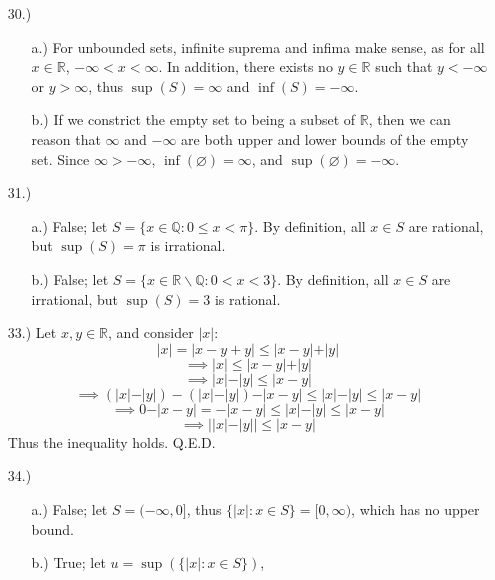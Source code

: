 \documentclass[12pt]{article}
\begin{document}
\begin{itemize}
    \item [30.)] \begin{itemize}
        \item [a.)] For unbounded sets, infinite suprema and infima make sense, as for all $x\in\mathbb{R}$, $-\infty<x<\infty$. In addition, there exists no $y\in\mathbb{R}$ such that $y<-\infty$ or $y>\infty$, thus $\sup(S)=\infty$ and $\inf(S)=-\infty$.

        \item [b.)] If we constrict the empty set to being a subset of $\mathbb{R}$, then we can reason that $\infty$ and $-\infty$ are both upper and lower bounds of the empty set. Since $\infty>-\infty$, $\inf(\varnothing)=\infty$, and $\sup(\varnothing)=-\infty$.
    \end{itemize}

    \item [31.)] \begin{itemize}
        \item [a.)] False; let $S=\{x\in\mathbb{Q}:0\leq x<\pi\}$. By definition, all $x\in S$ are rational, but $\sup(S)=\pi$ is irrational.

        \item [b.)] False; let $S=\{x\in\mathbb{R}\backslash\mathbb{Q}:0<x<3\}$. By definition, all $x\in S$ are irrational, but $\sup(S)=3$ is rational.
    \end{itemize}

    \item [33.)] Let $x,y\in\mathbb{R}$, and consider $\vert x\vert$:
        \[\vert x\vert=\vert x-y+y\vert\leq\vert x-y\vert+\vert y\vert\]
        \[\implies\vert x\vert\leq\vert x-y\vert+\vert y\vert\]
        \[\implies\vert x\vert-\vert y\vert\leq\vert x-y\vert\]
        \[\implies(\vert x\vert-\vert y\vert)-(\vert x\vert-\vert y\vert)-\vert x-y\vert\leq\vert x\vert-\vert y\vert\leq\vert x-y\vert\]
        \[\implies0-\vert x-y\vert=-\vert x-y\vert\leq\vert x\vert-\vert y\vert\leq\vert x-y\vert\]
        \[\implies\Big\vert\vert x\vert-\vert y\vert\Big\vert\leq\vert x-y\vert\]
        Thus the inequality holds. Q.E.D.

    \item [34.)] \begin{itemize}
        \item [a.)] False; let $S=(-\infty,0]$, thus $\{\vert x\vert:x\in S\}=[0,\infty)$, which has no upper bound.

        \item [b.)] True; let $u=\sup(\{\vert x\vert:x\in S\})$,
    \end{itemize}


\end{itemize}
\end{document}
